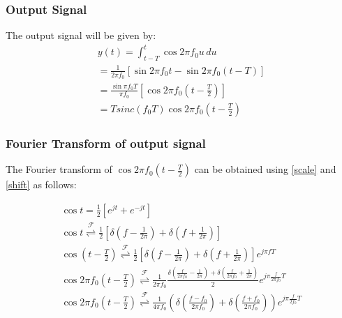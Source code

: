 \documentclass{beamer}
\providecommand{\sbrak}[1]{\ensuremath{{}\left[#1\right]}}
\providecommand{\brak}[1]{\ensuremath{\left(#1\right)}}
\providecommand{\fourier}{\overset{\mathcal{F}}{ \rightleftharpoons}}
\begin{document}
\begin{frame}
    \frametitle{Output Signal}
    \begin{flushleft}
The output signal will be given by:
\begin{align}
    y(t) = \int_{t-T}^t \cos{2\pi f_0u}\,du\\
     = \frac{1}{2\pi f_0}\sbrak{\sin{2\pi f_0t}- \sin2\pi f_0({t-T})}\\
      = \frac{\sin\pi f_0 T}{\pi f_0} \sbrak{\cos2\pi f_0 \brak{t - \frac{T}{2}}}\\
      = Tsinc( f_0 T)\cos2\pi f_0\brak{t - \frac{T}{2}}
      \label{output}
\end{align}
    \end{flushleft}
\end{frame}
\begin{frame}
    \frametitle{Fourier Transform of output signal}
    \begin{flushleft}
    The Fourier transform of $\cos2\pi f_0\brak{t - \frac{T}{2}}$ can be obtained using \eqref{scale} and \eqref{shift} as follows:

\begin{align}
    \cos t = \frac{1}{2}\sbrak{e^{jt} + e^{-jt}}\\
    \cos t \fourier \frac{1}{2}\sbrak{\delta\brak{f - \frac{1}{2\pi}} + \delta\brak{f + \frac{1}{2\pi}}}\\
    \cos\brak{t - \frac{T}{2}} \fourier \frac{1}{2}\sbrak{\delta\brak{f - \frac{1}{2\pi}} + \delta\brak{f + \frac{1}{2\pi}}} e^{j\pi fT}\\
    \cos2\pi f_0\brak{t - \frac{T}{2}} \fourier \frac{1}{2\pi f_0}\frac{\delta(\frac{f}{2\pi f_0} - \frac{1}{2\pi}) + \delta(\frac{f}{2\pi f_0} + \frac{1}{2\pi})}{2} e^{j\pi \frac{f}{2\pi f_0}T}\\
    \cos2\pi f_0\brak{t - \frac{T}{2}} \fourier\frac{1}{4\pi f_0}\brak{\delta\brak{\frac{f - f_0}{2\pi f_0}} + \delta\brak{\frac{f + f_0}{2\pi f_0}}}e^{j\pi \frac{f}{2f_0}T}
\end{align}

    \end{flushleft}
\end{frame}
\end{document}
